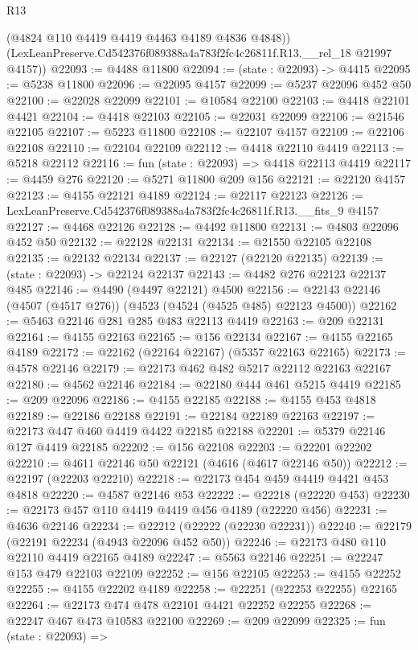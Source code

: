 \begin{lexlean}{R13}
\begin{coremodule}
        (@4824 @110 @4419 @4419 @4463 @4189 @4836 @4848))
      (LexLeanPreserve.Cd542376f089388a4a783f2fc4c26811f.R13.__rel_18 @21997 @4157))
@22093 := @4488 @11800
@22094 := (state : @22093) -> @4415
@22095 := @5238 @11800
@22096 := @22095 @4157
@22099 := @5237 @22096 @452 @50
@22100 := @22028 @22099
@22101 := @10584 @22100
@22103 := @4418 @22101 @4421
@22104 := @4418 @22103
@22105 := @22031 @22099
@22106 := @21546 @22105
@22107 := @5223 @11800
@22108 := @22107 @4157
@22109 := @22106 @22108
@22110 := @22104 @22109
@22112 := @4418 @22110 @4419
@22113 := @5218 @22112
@22116 := fun (state : @22093) => @4418 @22113 @4419
@22117 := @4459 @276
@22120 := @5271 @11800 @209 @156
@22121 := @22120 @4157
@22123 := @4155 @22121 @4189
@22124 := @22117 @22123
@22126 := LexLeanPreserve.Cd542376f089388a4a783f2fc4c26811f.R13.__fits_9 @4157
@22127 := @4468 @22126
@22128 := @4492 @11800
@22131 := @4803 @22096 @452 @50
@22132 := @22128 @22131
@22134 := @21550 @22105 @22108
@22135 := @22132 @22134
@22137 := @22127 (@22120 @22135)
@22139 := (state : @22093) -> @22124 @22137
@22143 := @4482 @276 @22123 @22137 @485
@22146 := @4490 (@4497 @22121) @4500
@22156 := @22143 @22146 (@4507 (@4517 @276)) (@4523 (@4524 (@4525 @485) @22123 @4500))
@22162 := @5463 @22146 @281 @285 @483 @22113 @4419
@22163 := @209 @22131
@22164 := @4155 @22163
@22165 := @156 @22134
@22167 := @4155 @22165 @4189
@22172 := @22162 (@22164 @22167) (@5357 @22163 @22165)
@22173 := @4578 @22146
@22179 := @22173 @462 @482 @5217 @22112 @22163 @22167
@22180 := @4562 @22146
@22184 := @22180 @444 @461 @5215 @4419
@22185 := @209 @22096
@22186 := @4155 @22185
@22188 := @4155 @453 @4818
@22189 := @22186 @22188
@22191 := @22184 @22189 @22163
@22197 := @22173 @447 @460 @4419 @4422 @22185 @22188
@22201 := @5379 @22146 @127 @4419 @22185
@22202 := @156 @22108
@22203 := @22201 @22202
@22210 := @4611 @22146 @50 @22121 (@4616 (@4617 @22146 @50))
@22212 := @22197 (@22203 @22210)
@22218 := @22173 @454 @459 @4419 @4421 @453 @4818
@22220 := @4587 @22146 @53
@22222 := @22218 (@22220 @453)
@22230 := @22173 @457 @110 @4419 @4419 @456 @4189 (@22220 @456)
@22231 := @4636 @22146
@22234 := @22212 (@22222 (@22230 @22231))
@22240 := @22179 (@22191 @22234 (@4943 @22096 @452 @50))
@22246 := @22173 @480 @110 @22110 @4419 @22165 @4189
@22247 := @5563 @22146
@22251 := @22247 @153 @479 @22103 @22109
@22252 := @156 @22105
@22253 := @4155 @22252
@22255 := @4155 @22202 @4189
@22258 := @22251 (@22253 @22255) @22165
@22264 := @22173 @474 @478 @22101 @4421 @22252 @22255
@22268 := @22247 @467 @473 @10583 @22100
@22269 := @209 @22099
@22325 := fun (state : @22093) =>

\end{coremodule}
\end{lexlean}
